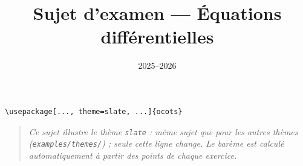 \documentclass[11pt]{ocots-exam}
\title{Sujet d'examen --- Équations différentielles}
\date{2025--2026}
\begin{document}
\maketitle

\begin{lstlisting}
\usepackage[..., theme=slate, ...]{ocots}
\end{lstlisting}
\begin{quote}\itshape
Ce sujet illustre le th\`eme \texttt{slate} : m\^eme sujet que pour les
autres th\`emes (\texttt{examples/themes/}) ; seule cette ligne change.
Le bar\`eme est calcul\'e automatiquement \`a partir des points de chaque
exercice.
\end{quote}

\medskip

\end{document}
